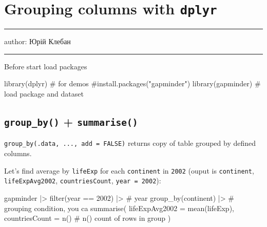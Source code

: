 \documentclass[
  letterpaper,
  DIV=11,
  numbers=noendperiod]{scrreprt}
\newenvironment{Shaded}{\begin{snugshade}}{\end{snugshade}}
\newcommand{\AttributeTok}[1]{\textcolor[rgb]{0.40,0.45,0.13}{#1}}
\newcommand{\CommentTok}[1]{\textcolor[rgb]{0.37,0.37,0.37}{#1}}
\newcommand{\DecValTok}[1]{\textcolor[rgb]{0.68,0.00,0.00}{#1}}
\newcommand{\FunctionTok}[1]{\textcolor[rgb]{0.28,0.35,0.67}{#1}}
\newcommand{\NormalTok}[1]{\textcolor[rgb]{0.00,0.23,0.31}{#1}}
\newcommand{\SpecialCharTok}[1]{\textcolor[rgb]{0.37,0.37,0.37}{#1}}
\begin{document}
\chapter{\texorpdfstring{Grouping columns with
\textbf{\texttt{dplyr}}}{Grouping columns with dplyr}}\label{grouping-columns-with-dplyr}

\begin{center}\rule{0.5\linewidth}{0.5pt}\end{center}

author: Юрій Клебан

\begin{center}\rule{0.5\linewidth}{0.5pt}\end{center}

Before start load packages

\begin{Shaded}
\begin{Highlighting}[]
\FunctionTok{library}\NormalTok{(dplyr) }\CommentTok{\# for demos}
\CommentTok{\#install.packages("gapminder")}
\FunctionTok{library}\NormalTok{(gapminder)  }\CommentTok{\# load package and dataset}
\end{Highlighting}
\end{Shaded}

\section{\texorpdfstring{\textbf{\texttt{group\_by()}} +
\textbf{\texttt{summarise()}}}{group\_by() + summarise()}}\label{group_by-summarise}

\texttt{group\_by(.data,\ ...,\ add\ =\ FALSE)} returns copy of table
grouped by defined columns.

Let's find average by \texttt{lifeExp} for each \texttt{continent} in
\texttt{2002} (ouput is \texttt{continent}, \texttt{lifeExpAvg2002},
\texttt{countriesCount}, \texttt{year\ =\ 2002}):

\begin{Shaded}
\begin{Highlighting}[]
\NormalTok{gapminder }\SpecialCharTok{|\textgreater{}}
    \FunctionTok{filter}\NormalTok{(year }\SpecialCharTok{==} \DecValTok{2002}\NormalTok{) }\SpecialCharTok{|\textgreater{}} \CommentTok{\# year}
    \FunctionTok{group\_by}\NormalTok{(continent) }\SpecialCharTok{|\textgreater{}} \CommentTok{\# grouping condition, you ca}
    \FunctionTok{summarise}\NormalTok{(}
        \AttributeTok{lifeExpAvg2002 =} \FunctionTok{mean}\NormalTok{(lifeExp),}
        \AttributeTok{countriesCount =} \FunctionTok{n}\NormalTok{() }\CommentTok{\# n() count of rows in group  }
\NormalTok{        ) }
\end{Highlighting}
\end{Shaded}
\end{document}
